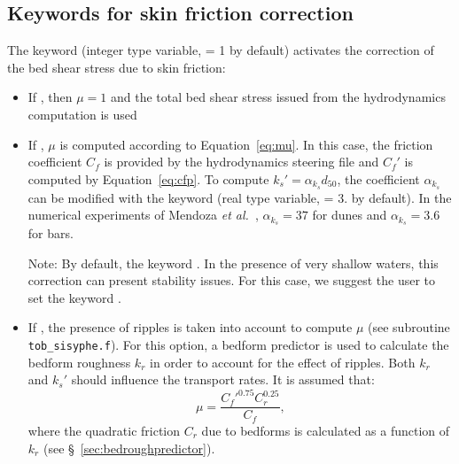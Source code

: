 \subsection{Keywords for skin friction correction}
The keyword  (integer type variable, {\ttfamily = 1} by default) activates the correction of the bed shear stress due to skin friction:
\begin{itemize}
\item If , then $\mu=1$ and the total bed shear stress issued from the hydrodynamics computation is used
\item If , $\mu$ is computed according to Equation~\ref{eq:mu}. In this case, the friction coefficient $C_f$ is provided by the hydrodynamics steering file and $C_f'$ is computed by Equation~\ref{eq:cfp}. To compute $k_s'=\alpha_{k_s} d_{50}$, the coefficient $\alpha_{k_s}$ can be modified with the keyword  (real type variable, {\ttfamily = 3.} by default). In the numerical experiments of Mendoza \textit{et al.}~\cite{Mendoza15}, $\alpha_{k_s}=37$ for dunes and $\alpha_{k_s}=3.6$ for bars.  

 \begin{WarningBlock}{Note:}
  By default, the keyword . In the presence of very shallow waters, this correction can present stability issues. For this case, we suggest the user to set the keyword .
  \end{WarningBlock}

\item If , the presence of ripples is taken into account to compute $\mu$ (see subroutine \texttt{tob\_sisyphe.f}). For this option, a bedform predictor is used to calculate the bedform roughness $k_r$ in order to account for the effect of ripples. Both $k_r$
and $k_s'$ should influence the transport rates. It is assumed that:
\begin{equation}\label{eq:mu2}
\mu =\frac{C_f'^{0.75} C_r^{0.25}}{C_f}, 
\end{equation}
where the quadratic friction $C_r$ due to bedforms is calculated as a
function of $k_r$ (see \S~\ref{sec:bedroughpredictor}). 
\end{itemize}

